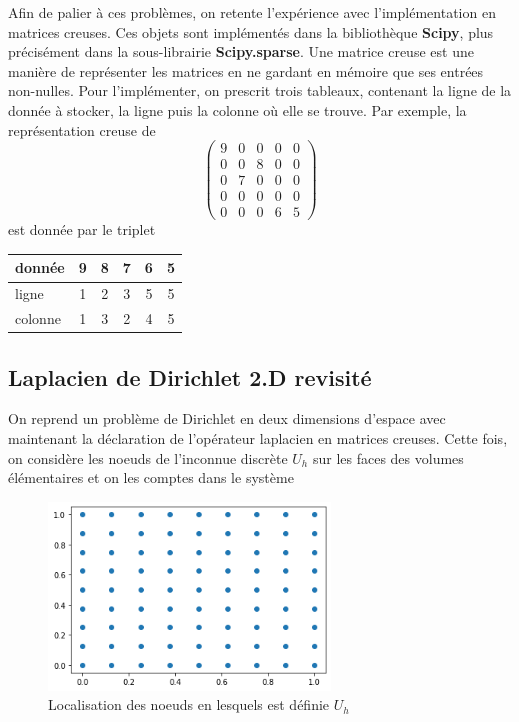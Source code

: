 Afin de palier à ces problèmes, on retente l'expérience avec l'implémentation en matrices creuses. Ces objets sont implémentés dans la bibliothèque \textbf{Scipy}, plus précisément dans la sous-librairie \textbf{Scipy.sparse}. Une matrice creuse est une manière de représenter les matrices en ne gardant en mémoire que ses entrées non-nulles. Pour l'implémenter, on prescrit trois tableaux, contenant la ligne de la donnée à stocker, la ligne puis la colonne où elle se trouve. Par exemple, la représentation creuse de $$ \begin{pmatrix} 9 & 0 & 0 & 0 & 0 \\ 0 & 0 & 8 & 0 & 0 \\ 0 & 7 & 0 & 0 & 0 \\ 0 & 0 & 0 & 0 & 0 \\ 0 & 0 & 0 & 6 & 5 \end{pmatrix} $$ est donnée par le triplet \begin{center}
\begin{tabular}{ |l||c|c|c|c|c| } 
\hline
donnée & 9 & 8 & 7 & 6 & 5 \\ 
\hline
ligne & 1 & 2 & 3 & 5 & 5 \\ 
\hline
colonne & 1 & 3 & 2 & 4 & 5 \\ 
\hline
\end{tabular}
\end{center}

\subsection*{Laplacien de Dirichlet 2.D revisité} 

On reprend un problème de Dirichlet en deux dimensions d'espace avec maintenant la déclaration de l'opérateur laplacien en matrices creuses. Cette fois, on considère les noeuds de l'inconnue discrète $U_h$ sur les faces des volumes élémentaires et on les comptes dans le système

\begin{figure}[htp]
    \centering
    \includegraphics[width=7.5cm]{Images/preliminaires/maillages/bords 2D.png}
    \caption{Localisation des noeuds en lesquels est définie $U_h$}
\end{figure}

